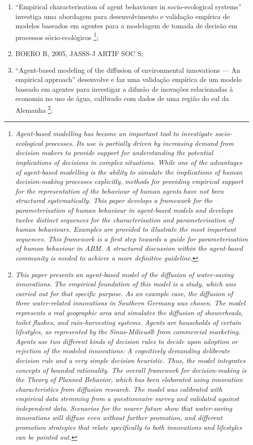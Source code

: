 \begin{enumerate}
\item ``Empirical characterisation of agent behaviours in socio-ecological systems'' investiga uma abordagem para desenvolvimento e validação empírica de modelos baseados em agentes para a modelagem de tomada de decisão em processos sócio-ecológicos \footnote{\textit{Agent-based modelling has become an important tool to investigate socio-ecological processes. Its use is partially driven by increasing demand from decision makers to provide support for understanding the potential implications of decisions in complex situations. While one of the advantages of agent-based modelling is the ability to simulate the implications of human decision-making processes explicitly, methods for providing empirical support for the representation of the behaviour of human agents have not been structured systematically. This paper develops a framework for the parameterisation of human behaviour in agent-based models and develops twelve distinct sequences for the characterisation and parameterisation of human behaviours. Examples are provided to illustrate the most important sequences. This framework is a first step towards a guide for parameterisation of human behaviour in ABM. A structured discussion within the agent-based community is needed to achieve a more definitive guideline.}};
\item BOERO R, 2005, JASSS-J ARTIF SOC S;
\item ``Agent-based modeling of the diffusion of environmental innovations — An empirical approach'' desenvolve e faz uma validação empírica de um modelo baseado em agentes para investigar a difusão de inovações relacionadas à economia no uso de água, calibrado com dados de uma região do sul da Alemanha \footnote{\textit{This paper presents an agent-based model of the diffusion of water-saving innovations. The empirical foundation of this model is a study, which was carried out for that specific purpose. As an example case, the diffusion of three water-related innovations in Southern Germany was chosen. The model represents a real geographic area and simulates the diffusion of showerheads, toilet flushes, and rain-harvesting systems. Agents are households of certain lifestyles, as represented by the Sinus-Milieus® from commercial marketing. Agents use two different kinds of decision rules to decide upon adoption or rejection of the modeled innovations: A cognitively demanding deliberate decision rule and a very simple decision heuristic. Thus, the model integrates concepts of bounded rationality. The overall framework for decision-making is the Theory of Planned Behavior, which has been elaborated using innovation characteristics from diffusion research. The model was calibrated with empirical data stemming from a questionnaire survey and validated against independent data. Scenarios for the nearer future show that water-saving innovations will diffuse even without further promotion, and different promotion strategies that relate specifically to both innovations and lifestyles can be pointed out.}};

\end{enumerate}
